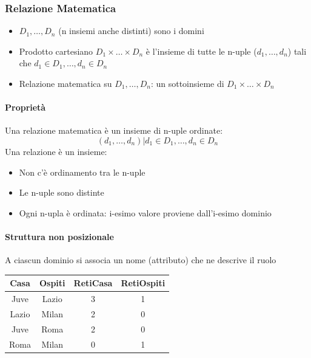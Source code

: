\documentclass[12pt,a4paper]{article}
\begin{document}
\subsubsection{Relazione Matematica}
\begin{itemize}
\item $D_1, \dots, D_n$ (n insiemi anche distinti) sono i domini
\item Prodotto cartesiano $D_1 \times \dots \times D_n$ è l'insieme di tutte le n-uple ($d_1, \dots, d_n$) tali che $d_1 \in D_1, \dots, d_n \in D_n$
\item Relazione matematica su $D_1, \dots, D_n$: un sottoinsieme di $D_1 \times \dots \times D_n$
\end{itemize}
\paragraph{Proprietà\\}
Una relazione matematica è un insieme di n-uple ordinate: $$(d_1, \dots, d_n) | d_1 \in D_1, \dots, d_n \in D_n$$
Una relazione è un insieme:
\begin{itemize}
\item Non c'è ordinamento tra le n-uple
\item Le n-uple sono distinte
\item Ogni n-upla è ordinata: i-esimo valore proviene dall'i-esimo dominio
\end{itemize}

\paragraph{Struttura non posizionale}
A ciascun dominio si associa un nome (attributo) che ne descrive il ruolo
\begin{center}\begin{tabular}{|cccc|}\hline
\textbf{Casa} & \textbf{Ospiti} & \textbf{RetiCasa} &  \textbf{RetiOspiti}\\ \hline
Juve & Lazio & 3 & 1 \\ 
Lazio & Milan & 2 & 0\\ 
Juve & Roma & 2 & 0 \\ 
Roma & Milan & 0 & 1 \\ \hline
\end{tabular}\end{center}
\end{document}

